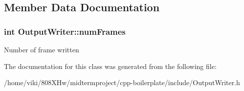 \subsection{Member Data Documentation}
\subsubsection[{\texorpdfstring{num\+Frames}{numFrames}}]{\setlength{\rightskip}{0pt plus 5cm}int Output\+Writer\+::num\+Frames}\hypertarget{class_output_writer_a2e2c9edadbe0888c1ab7ae585c9ce54a}{}\label{class_output_writer_a2e2c9edadbe0888c1ab7ae585c9ce54a}
Number of frame written 

The documentation for this class was generated from the following file\+:\begin{DoxyCompactItemize}
\item 
/home/viki/808\+X\+Hw/midtermproject/cpp-\/boilerplate/include/Output\+Writer.\+h\end{DoxyCompactItemize}
